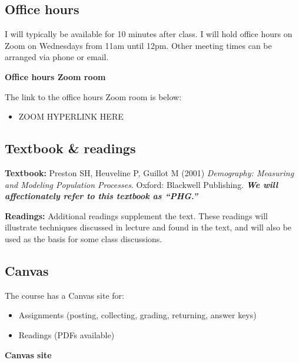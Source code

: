 \documentclass[
]{book}
\providecommand{\tightlist}{%
  \setlength{\itemsep}{0pt}\setlength{\parskip}{0pt}}
\begin{document}
\hypertarget{office-hours}{%
\subsection*{Office hours}\label{office-hours}}

I will typically be available for 10 minutes after class. I will hold office hours on Zoom on Wednesdays from 11am until 12pm. Other meeting times can be arranged via phone or email.

\textbf{Office hours Zoom room}

The link to the office hours Zoom room is below:

\begin{itemize}
\tightlist
\item
  ZOOM HYPERLINK HERE
\end{itemize}

\hypertarget{textbook-readings}{%
\subsection*{Textbook \& readings}\label{textbook-readings}}

\textbf{Textbook:} Preston SH, Heuveline P, Guillot M (2001) \emph{Demography: Measuring and Modeling Population Processes}. Oxford: Blackwell Publishing. \textbf{\emph{We will affectionately refer to this textbook as ``PHG.''}}

\textbf{Readings:} Additional readings supplement the text. These readings will illustrate techniques discussed in lecture and found in the text, and will also be used as the basis for some class discussions.

\hypertarget{canvas}{%
\subsection*{Canvas}\label{canvas}}

The course has a Canvas site for:

\begin{itemize}
\tightlist
\item
  Assignments (posting, collecting, grading, returning, answer keys)
\item
  Readings (PDFs available)
\end{itemize}

\textbf{Canvas site}
\end{document}
